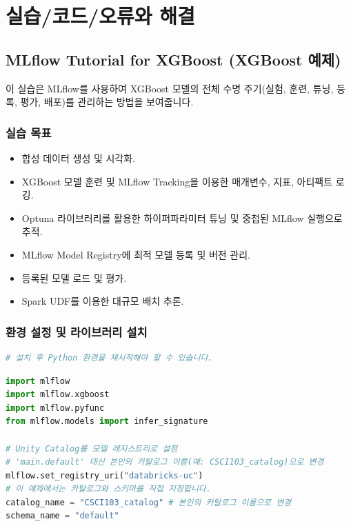 \documentclass[11pt,a4paper]{article}
\begin{document}
\newpage
\section*{실습/코드/오류와 해결}

\subsection*{MLflow Tutorial for XGBoost (XGBoost 예제)}
이 실습은 MLflow를 사용하여 XGBoost 모델의 전체 수명 주기(실험, 훈련, 튜닝, 등록, 평가, 배포)를 관리하는 방법을 보여줍니다.

\subsubsection*{실습 목표}
\begin{itemize}
    \item 합성 데이터 생성 및 시각화.
    \item XGBoost 모델 훈련 및 MLflow Tracking을 이용한 매개변수, 지표, 아티팩트 로깅.
    \item Optuna 라이브러리를 활용한 하이퍼파라미터 튜닝 및 중첩된 MLflow 실행으로 추적.
    \item MLflow Model Registry에 최적 모델 등록 및 버전 관리.
    \item 등록된 모델 로드 및 평가.
    \item Spark UDF를 이용한 대규모 배치 추론.
\end{itemize}

\subsubsection*{환경 설정 및 라이브러리 설치}
\begin{lstlisting}[language=Python, caption={라이브러리 설치 및 Python 재시작}]
%pip install mlflow xgboost optuna scikit-learn numpy pandas matplotlib
# 설치 후 Python 환경을 재시작해야 할 수 있습니다.
\end{lstlisting}

\begin{lstlisting}[language=Python, caption={MLflow 및 Unity Catalog 설정}]
import mlflow
import mlflow.xgboost
import mlflow.pyfunc
from mlflow.models import infer_signature

# Unity Catalog를 모델 레지스트리로 설정
# 'main.default' 대신 본인의 카탈로그 이름(예: CSCI103_catalog)으로 변경
mlflow.set_registry_uri("databricks-uc")
# 이 예제에서는 카탈로그와 스키마를 직접 지정합니다.
catalog_name = "CSCI103_catalog" # 본인의 카탈로그 이름으로 변경
schema_name = "default"
\end{lstlisting}
\end{document}
